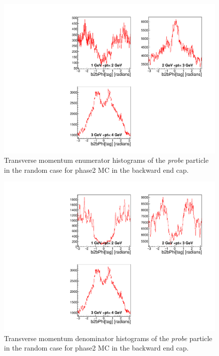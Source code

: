 \documentclass[a4paper,11pt,twosided,final,german,openbib,pdftex,listof=totoc,bibliography=totoc]{scrbook}
\begin{document}
\begin{appendix}
\begin{figure}[!htbp]
	\centering
	\includegraphics[width=\textwidth]{Plots/master/xPtMPhiRandomECE_MC}
	\caption[Transverse Momentum $\phi$ Random Backward End Cap Enumerator Histogram Phase2 MC]{Transverse momentum enumerator histograms of the \textit{probe} particle in the random case for phase2 MC in the backward end cap.}
	\label{plt:PtMPhiRandomECE_MC}
\end{figure}

\begin{figure}[!htbp]
	\centering
	\includegraphics[width=\textwidth]{Plots/master/xPtMPhiRandomECD_MC}
	\caption[Transerse Momentum $\phi$ Random Backward End Cap Denominator Histogram Phase2 MC]{Transverse momentum denominator histograms of the \textit{probe} particle in the random case for phase2 MC in the backward end cap.}
	\label{plt:PtMPhiRandomECD_MC}
\end{figure}



\end{appendix}
\end{document}
